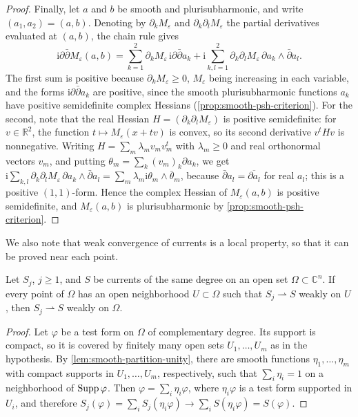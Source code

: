 \begin{proof}
Finally, let $a$ and $b$ be smooth and plurisubharmonic, and write $(a_1,a_2)=(a,b)$. Denoting by $\partial_kM_\varepsilon$ and $\partial_k\partial_lM_\varepsilon$ the partial derivatives evaluated at $(a,b)$, the chain rule gives
\[
 \mathrm{i}\partial\bar\partial M_\varepsilon(a,b)
 =\sum_{k=1}^2\partial_kM_\varepsilon\,\mathrm{i}\partial\bar\partial a_k
 +\mathrm{i}\sum_{k,l=1}^2\partial_k\partial_lM_\varepsilon\,\partial a_k\wedge\bar\partial a_l.
\]
The first sum is positive because $\partial_kM_\varepsilon\ge0$, $M_\varepsilon$ being increasing in each variable, and the forms $\mathrm i\partial\bar\partial a_k$ are positive, since the smooth plurisubharmonic functions $a_k$ have positive semidefinite complex Hessians (\cref{prop:smooth-psh-criterion}). For the second, note that the real Hessian $H=(\partial_k\partial_lM_\varepsilon)$ is positive semidefinite: for $v\in\mathbb R^2$, the function $t\mapsto M_\varepsilon(x+tv)$ is convex, so its second derivative $v^tHv$ is nonnegative. Writing $H=\sum_m\lambda_mv_mv_m^t$ with $\lambda_m\ge0$ and real orthonormal vectors $v_m$, and putting $\theta_m=\sum_k(v_m)_k\partial a_k$, we get $\mathrm i\sum_{k,l}\partial_k\partial_lM_\varepsilon\,\partial a_k\wedge\bar\partial a_l=\sum_m\lambda_m\mathrm i\theta_m\wedge\bar\theta_m$, because $\bar\partial a_l=\overline{\partial a_l}$ for real $a_l$; this is a positive $(1,1)$-form. Hence the complex Hessian of $M_\varepsilon(a,b)$ is positive semidefinite, and $M_\varepsilon(a,b)$ is plurisubharmonic by \cref{prop:smooth-psh-criterion}.
\end{proof}

We also note that weak convergence of currents is a local property, so that it can be proved near each point.

\begin{lemma}\label{lem:weak-convergence-local}
Let $S_j$, $j\ge1$, and $S$ be currents of the same degree on an open set $\Omega\subset\mathbb C^n$. If every point of $\Omega$ has an open neighborhood $U\subset\Omega$ such that $S_j\rightharpoonup S$ weakly on $U$, then $S_j\rightharpoonup S$ weakly on $\Omega$.
\end{lemma}
\begin{proof}
Let $\varphi$ be a test form on $\Omega$ of complementary degree. Its support is compact, so it is covered by finitely many open sets $U_1,\ldots,U_m$ as in the hypothesis. By \cref{lem:smooth-partition-unity}, there are smooth functions $\eta_1,\ldots,\eta_m$ with compact supports in $U_1,\ldots,U_m$, respectively, such that $\sum_i\eta_i=1$ on a neighborhood of $\operatorname{Supp}\varphi$. Then $\varphi=\sum_i\eta_i\varphi$, where $\eta_i\varphi$ is a test form supported in $U_i$, and therefore $S_j(\varphi)=\sum_iS_j(\eta_i\varphi)\to\sum_iS(\eta_i\varphi)=S(\varphi)$.
\end{proof}

